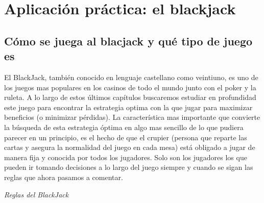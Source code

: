 \documentclass[12pt,a4paper,]{book}
\title{}
\author{Nombre Completo Autor}
\date{18/11/2021}
\def\ifdoblecara{} %
\def\ifprincipal{} %
\let\ifprincipal\undefined %
\numberwithin{dummy}{section}
\theoremstyle{ocrenumbox}
\theoremstyle{blacknumex}
\theoremstyle{blacknumbox}
\theoremstyle{ocrenum}
\theoremstyle{ocrenum}
\begin{document}




\raggedbottom

\ifdefined\ifprincipal
\else
\setlength{\parindent}{1em}
\pagestyle{fancy}
\setcounter{tocdepth}{4}
\tableofcontents

\fi

\ifdefined\ifdoblecara
\fancyhead{}{}
\fancyhead[LE,RO]{\scriptsize\rightmark}
\fancyfoot[LO,RE]{\scriptsize\slshape \leftmark}
\fancyfoot[C]{}
\fancyfoot[LE,RO]{\footnotesize\thepage}
\else
\fancyhead{}{}
\fancyhead[RO]{\scriptsize\rightmark}
\fancyfoot[LO]{\scriptsize\slshape \leftmark}
\fancyfoot[C]{}
\fancyfoot[RO]{\footnotesize\thepage}
\fi

\renewcommand{\headrulewidth}{0.4pt}
\renewcommand{\footrulewidth}{0.4pt}

\hypertarget{Seccion3}{%
\chapter{Aplicación práctica: el blackjack}\label{Seccion3}}

\hypertarget{Seccion31}{%
\section{Cómo se juega al blacjack y qué tipo de juego
es}\label{Seccion31}}

El BlackJack, también conocido en lenguaje castellano como veintiuno, es
uno de los juegos mas populares en los casinos de todo el mundo junto
con el poker y la ruleta. A lo largo de estos últimos capítulos
buscaremos estudiar en profundidad este juego para encontrar la
estrategia optima con la que jugar para maximizar beneficios (o
minimizar pérdidas). La característica mas importante que convierte la
búsqueda de esta estrategia óptima en algo mas sencillo de lo que
pudiera parecer en un principio, es el hecho de que el crupier (persona
que reparte las cartas y asegura la normalidad del juego en cada mesa)
está obligado a jugar de manera fija y conocida por todos los jugadores.
Solo son los jugadores los que pueden ir tomando decisiones a lo largo
del juego siempre y cuando se sigan las reglas que ahora pasamos a
comentar.

\emph{Reglas del BlackJack}
\end{document}

